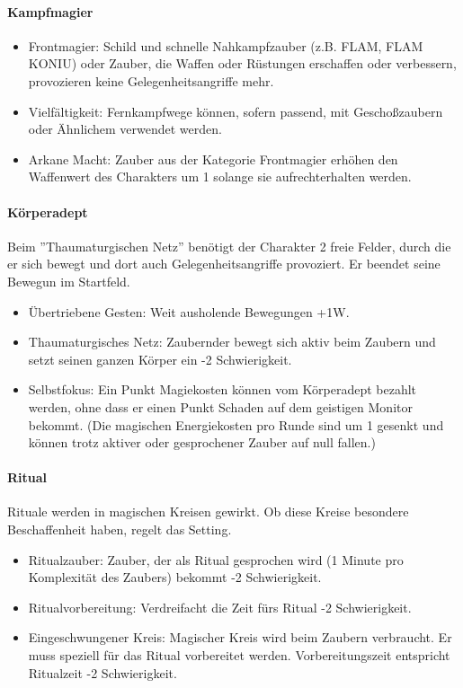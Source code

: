 \documentclass{article}
\begin{document}
\paragraph{Kampfmagier}

\begin{itemize}
\item Frontmagier: Schild und schnelle Nahkampfzauber (z.B. FLAM, FLAM KONIU) oder Zauber, die Waffen oder Rüstungen erschaffen oder verbessern, provozieren keine Gelegenheitsangriffe mehr.
\item Vielfältigkeit: Fernkampfwege können, sofern passend, mit Geschoßzaubern oder Ähnlichem verwendet werden.
\item Arkane Macht: Zauber aus der Kategorie Frontmagier erhöhen den Waffenwert des Charakters um 1 solange sie aufrechterhalten werden.
\end{itemize}

\paragraph{Körperadept}

Beim ''Thaumaturgischen Netz'' benötigt der Charakter 2 freie Felder, durch die er sich bewegt und dort auch Gelegenheitsangriffe provoziert. Er beendet seine Bewegun im Startfeld.

\begin{itemize}
\item Übertriebene Gesten: Weit ausholende Bewegungen +1W.
\item Thaumaturgisches Netz: Zaubernder bewegt sich aktiv beim Zaubern und setzt seinen ganzen Körper ein -2 Schwierigkeit.
\item Selbstfokus: Ein Punkt Magiekosten können vom Körperadept bezahlt werden, ohne dass er einen Punkt Schaden auf dem geistigen Monitor bekommt. (Die magischen Energiekosten pro Runde sind um 1 gesenkt und können trotz aktiver oder gesprochener Zauber auf null fallen.)
\end{itemize}

\paragraph{Ritual}

Rituale werden in magischen Kreisen gewirkt. Ob diese Kreise besondere Beschaffenheit haben, regelt das Setting.

\begin{itemize}
\item Ritualzauber: Zauber, der als Ritual gesprochen wird (1 Minute pro Komplexität des Zaubers) bekommt -2 Schwierigkeit.
\item Ritualvorbereitung: Verdreifacht die Zeit fürs Ritual -2 Schwierigkeit.
\item Eingeschwungener Kreis: Magischer Kreis wird beim Zaubern verbraucht. Er muss speziell für das Ritual vorbereitet werden. Vorbereitungszeit entspricht Ritualzeit -2 Schwierigkeit.
\end{itemize}
\end{document}
